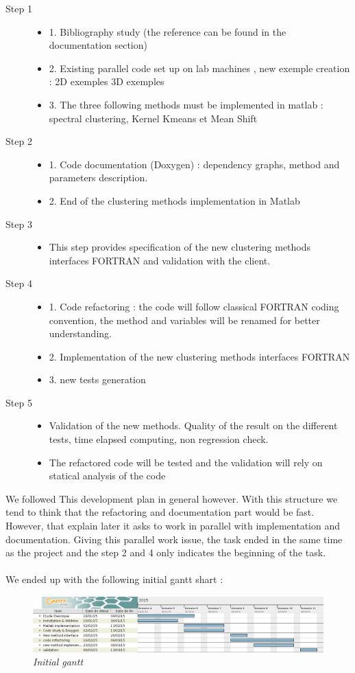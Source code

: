 \begin{description}
\item[Step 1]
	\begin{itemize}
	\item 1. Bibliography study (the reference can be found in the documentation section)
 	\item 2. Existing parallel code set up on lab machines , new exemple creation : 2D exemples 3D exemples
	\item 3. The three following methods must be implemented in matlab : spectral clustering, Kernel Kmeans et Mean Shift        
	\end{itemize} 
\item[Step 2]
	\begin{itemize}
	\item 1. Code documentation (Doxygen) : dependency graphs, method and parameters description.
	\item 2. End of the clustering methods implementation in Matlab
	\end{itemize}
\item[Step 3]
	\begin{itemize}
	\item This step provides specification of the new clustering methods interfaces FORTRAN and validation with the client.
	\end{itemize}
\item[Step 4]
	\begin{itemize}
	\item 1. Code refactoring : the code will follow classical FORTRAN coding convention, the method and variables will be renamed for better understanding.
	\item 2. Implementation of the new clustering methods interfaces FORTRAN
	\item 3. new tests generation
	\end{itemize}
\item[Step 5]
	\begin{itemize}
	\item Validation of the new methods. Quality of the result on the different tests, time elapsed computing, non regression check.
	\item The refactored code will be tested and the validation will rely on statical analysis of the code
	\end{itemize}
\end{description}


We followed This development plan in general however. With this structure we tend to think that the refactoring and documentation part would be fast. However, that explain later it asks to work in parallel with implementation and documentation. Giving this parallel work issue, the task ended in the same time as the project and the step 2 and 4 only indicates the beginning of the task.
 \\
 \\
 
  
 We ended up with the following initial gantt shart :
 
 \begin{figure}[h!]
\includegraphics[width=1\textwidth]{Image/gantt.png}\centering
\caption{\textit{Initial gantt}}
\end{figure}
